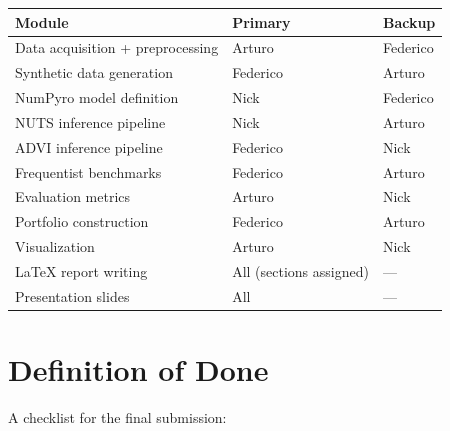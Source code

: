 \documentclass[11pt,a4paper]{article}
\begin{document}
\begin{center}
\begin{tabular}{@{}lll@{}}
\toprule
\textbf{Module} & \textbf{Primary} & \textbf{Backup} \\
\midrule
Data acquisition + preprocessing & Arturo & Federico \\
Synthetic data generation & Federico & Arturo \\
NumPyro model definition & Nick & Federico \\
NUTS inference pipeline & Nick & Arturo \\
ADVI inference pipeline & Federico & Nick \\
Frequentist benchmarks & Federico & Arturo \\
Evaluation metrics & Arturo & Nick \\
Portfolio construction & Federico & Arturo \\
Visualization & Arturo & Nick \\
LaTeX report writing & All (sections assigned) & --- \\
Presentation slides & All & --- \\
\bottomrule
\end{tabular}
\end{center}


\part{Definition of Done}

A checklist for the final submission:
\end{document}
